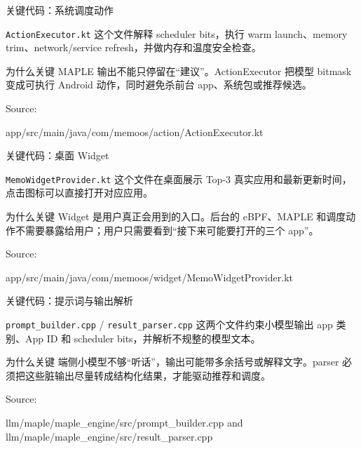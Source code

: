 \documentclass[UTF8,aspectratio=169,10pt]{ctexbeamer}
\newcommand{\code}[1]{\texttt{\small #1}}
\newcommand{\sourcefoot}[1]{%
  \vfill
  {\scriptsize\textcolor{memoGray}{Source: }%
  \parbox[t]{0.84\textwidth}{\raggedright\ttfamily\scriptsize #1}}%
}
\begin{document}
\begin{frame}{关键代码：系统调度动作}
  \begin{block}{\code{ActionExecutor.kt}}
    这个文件解释 scheduler bits，执行 warm launch、memory trim、network/service refresh，并做内存和温度安全检查。
  \end{block}
  \begin{block}{为什么关键}
    MAPLE 输出不能只停留在“建议”。ActionExecutor 把模型 bitmask 变成可执行 Android 动作，同时避免杀前台 app、系统包或推荐候选。
  \end{block}
  \sourcefoot{app/src/main/java/com/memoos/action/ActionExecutor.kt}
\end{frame}

\begin{frame}{关键代码：桌面 Widget}
  \begin{block}{\code{MemoWidgetProvider.kt}}
    这个文件在桌面展示 Top-3 真实应用和最新更新时间，点击图标可以直接打开对应应用。
  \end{block}
  \begin{block}{为什么关键}
    Widget 是用户真正会用到的入口。后台的 eBPF、MAPLE 和调度动作不需要暴露给用户；用户只需要看到“接下来可能要打开的三个 app”。
  \end{block}
  \sourcefoot{app/src/main/java/com/memoos/widget/MemoWidgetProvider.kt}
\end{frame}

\begin{frame}{关键代码：提示词与输出解析}
  \begin{block}{\code{prompt\_builder.cpp} / \code{result\_parser.cpp}}
    这两个文件约束小模型输出 app 类别、App ID 和 scheduler bits，并解析不规整的模型文本。
  \end{block}
  \begin{block}{为什么关键}
    端侧小模型不够“听话”，输出可能带多余括号或解释文字。parser 必须把这些脏输出尽量转成结构化结果，才能驱动推荐和调度。
  \end{block}
  \sourcefoot{llm/maple/maple\_engine/src/prompt\_builder.cpp and llm/maple/maple\_engine/src/result\_parser.cpp}
\end{frame}
\end{document}
